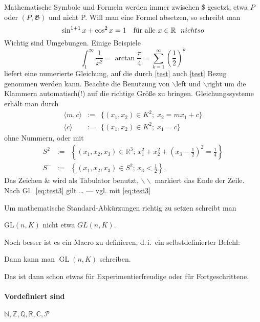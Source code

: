 \documentclass[12pt]{scrartcl}%
\theoremstyle{nonumberplain}
\DeclareMathOperator{\GL}{GL} %
\newcommand{\N}{\mathbb{N}}
\newcommand{\Z}{\mathbb{Z}}
\newcommand{\Q}{\mathbb{Q}}
\newcommand{\R}{\mathbb{R}}
\newcommand{\C}{\mathbb{C}}
\newcommand{\cP}{{\mathcal P}}
\begin{document}
Mathematische Symbole und Formeln werden immer zwischen \$ gesetzt;
etwa $P$ oder $(P,\mathfrak{G})$ und nicht P. Will man eine Formel
absetzen, so
schreibt man 
\[
\sin^{1+1}x+\cos^2x=1 \mbox{\quad für alle } x\in\mathbb R\ \ nicht so
\]
Wichtig sind \glqq Umgebungen\grqq. Einige Beispiele
\begin{equation}
  \label{test} %
  \int_1^\infty\frac{1}{x^2}=\arctan\frac\pi4
=\sum_{k=1}^\infty\left(\frac{1}{2}\right)^k
\end{equation}
liefert eine numerierte Gleichung,  auf die durch 
\eqref{test} auch \ref{test} Bezug 
genommen werden kann. Beachte die Benutzung von
$\backslash$left und $\backslash$right 
um die Klammern automatisch(!) auf die richtige Größe zu bringen.
Gleichungssysteme erhält man durch
  \begin{eqnarray*} %
    \langle m,c\rangle&:=&\{(x_1,x_2)\in K^2;\; x_2=mx_1+c\} \\
    \langle c\rangle&:=&\{(x_1,x_2)\in K^2;\; x_1=c\}
  \end{eqnarray*}
ohne Nummern, oder mit
\begin{eqnarray}
  \label{eq:test2} %
  S^2 &:= &\left\{(x_1,x_2,x_3)\in\mathbb R^3;\,
x_1^2+x_2^2+(x_3-\frac12)^2=\frac14\right\}\\
  \label{eq:test3} %
S^-&:=&\left\{(x_1,x_2,x_3)\in S^2;\,x_3<\frac12\right\},
\end{eqnarray}
Das Zeichen \& wird als Tabulator benutzt, $\backslash\backslash$
markiert das Ende der Zeile.
\\ 
Nach Gl.~\eqref{eq:test3} gilt \dots
\qquad
--- vgl. mit \ref{eq:test3}

Um mathematische Standard-Abkürzungen richtig zu setzen schreibt man

$\mbox{GL}(n,K)$ nicht etwa $GL(n,K)$.

Noch besser ist es ein Macro zu definieren, d.\,i.\ ein
selbstdefinierter Befehl:


Dann kann man $\GL(n,K)$ schreiben.

Das ist dann schon etwas für Experimentierfreudige oder für
Fortgeschrittene.


\paragraph{Vordefiniert sind} 
$\N, \Z, \Q, \R, \C, \cP$
\end{document}
